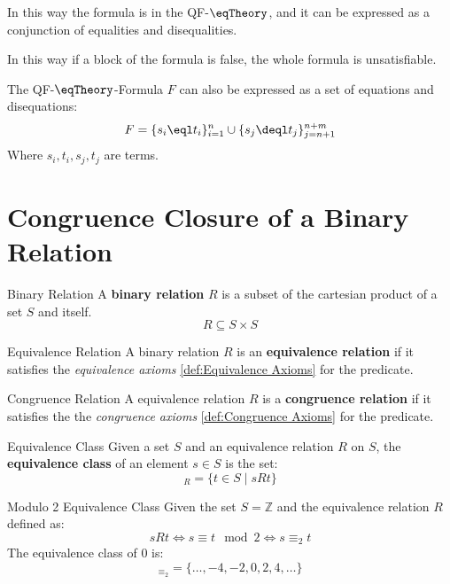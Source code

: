 In this way the formula is in the QF-$\eqTheory$, and it can be 
expressed as a conjunction of equalities and disequalities.

In this way if a block of the formula is false, the whole formula is unsatisfiable.

The QF-$\eqTheory$-Formula $F$ can also be expressed as a set of equations and disequations:
\begin{equation*}
    F = \{ s_i \eql t_i \}_{i=1}^{n} \cup \{ s_j \deql t_j \}_{j=n+1}^{n+m}
\end{equation*}
Where $s_i, t_i, s_j, t_j$ are terms.

\section{Congruence Closure of a Binary Relation}
\label{sec:Congruence Closure of a Binary Relation}

\begin{definition}{Binary Relation}
    A \textbf{binary relation} $R$ is a subset of the cartesian product 
    of a set $S$ and itself.
    \begin{equation*}
        R \subseteq S \times S
    \end{equation*}
\end{definition}

\begin{definition}{Equivalence Relation}
    A binary relation $R$ is an \textbf{equivalence relation} if it satisfies the 
    \textit{equivalence axioms} \ref{def:Equivalence Axioms} for the predicate.
    
\end{definition}

\begin{definition}{Congruence Relation}
    A equivalence relation $R$ is a \textbf{congruence relation} if it satisfies the 
    the \textit{congruence axioms} \ref{def:Congruence Axioms} for the predicate.
\end{definition}

\begin{definition}{Equivalence Class}
    Given a set $S$ and an equivalence relation $R$ on $S$, 
    the \textbf{equivalence class} of an element $s \in S$ is the set:
    \begin{equation*}
        [s]_R = \{ t \in S \; | \; sRt \}
    \end{equation*}
\end{definition}

\begin{example}{Modulo 2 Equivalence Class}
    Given the set $S = \mathbb{Z}$ and the equivalence relation $R$ defined as:
    \begin{equation*}
        sRt \iff s \equiv t \mod 2 \iff s \equiv_2 t
    \end{equation*}
    The equivalence class of $0$ is:
    \begin{equation*}
        [0]_{\equiv_2} = \{ \dots, -4, -2, 0, 2, 4, \dots \}
    \end{equation*}
\end{example}

